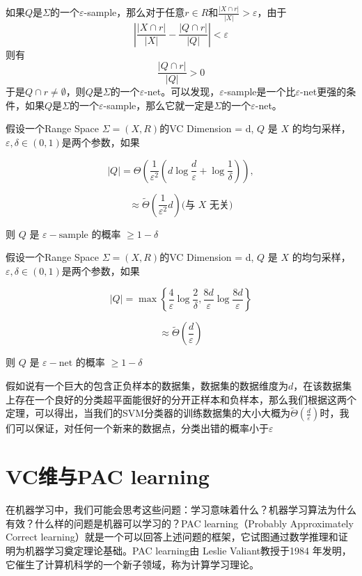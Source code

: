 \documentclass[lang=cn,newtx,10pt,scheme=chinese,chinesefont=nofont,citestyle=gb7714-2015, bibstyle=gb7714-2015]{elegantbook}
\begin{document}
\begin{refsection}
如果$Q$是$\Sigma$的一个$\varepsilon$-sample，那么对于任意$r \in R$和$\frac{|X\cap r|}{|X|} > \varepsilon$，由于
\[|\frac{|X\cap r|}{|X|}-\frac{|Q\cap r|}{|Q|}| < \varepsilon\]
则有\[\frac{|Q\cap r|}{|Q|} > 0\]
于是$Q\cap r\neq \emptyset$，则$Q$是$\Sigma$的一个$\varepsilon$-net。可以发现，$\varepsilon$-sample是一个比$\varepsilon$-net更强的条件，如果$Q$是$\Sigma$的一个$\varepsilon$-sample，那么它就一定是$\Sigma$的一个$\varepsilon$-net。

\begin{theorem}
    假设一个Range Space $\Sigma = (X, R)$的VC Dimension = d, $Q$ 是 $X$ 的均匀采样，$\varepsilon, \delta \in (0,1)$是两个参数，如果

\[|Q| = \Theta \left( \frac{1}{\varepsilon^2} \left( d \log \frac{d}{\varepsilon} + \log \frac{1}{\delta} \right) \right),\]

\[\approx \widetilde{\Theta} \left( \frac{1}{\varepsilon^2} d \right)\text{(与 } X \text{ 无关)}\]

则 $Q$ 是 $\varepsilon - \text{sample}$ 的概率 $\geq 1 - \delta$
\end{theorem}

\begin{theorem}
   假设一个Range Space $\Sigma = (X, R)$的VC Dimension = d, $Q$ 是 $X$ 的均匀采样，$\varepsilon, \delta \in (0,1)$是两个参数，如果

\[|Q| = \max \left\{ \frac{4}{\varepsilon} \log \frac{2}{\delta}, \frac{8d}{\varepsilon} \log \frac{8d}{\varepsilon} \right\}\]

\[\approx \widetilde{\Theta} \left( \frac{d}{\varepsilon} \right)\]

则 $Q$ 是 $\varepsilon - \text{net}$ 的概率 $\geq 1 - \delta$
\end{theorem}

假如说有一个巨大的包含正负样本的数据集，数据集的数据维度为$d$，在该数据集上存在一个良好的分类超平面能很好的分开正样本和负样本，那么我们根据这两个定理，可以得出，当我们的SVM分类器的训练数据集的大小大概为$ \widetilde{\Theta} \left( \frac{d}{\varepsilon} \right)$时，我们可以保证，对任何一个新来的数据点，分类出错的概率小于$\varepsilon$

\section{VC维与PAC learning}
在机器学习中，我们可能会思考这些问题：学习意味着什么？机器学习算法为什么有效？什么样的问题是机器可以学习的？PAC learning（Probably Approximately Correct learning）就是一个可以回答上述问题的框架，它试图通过数学推理和证明为机器学习奠定理论基础。PAC learning由 Leslie Valiant教授于1984 年发明，它催生了计算机科学的一个新子领域，称为计算学习理论。


\end{refsection}
\end{document}
